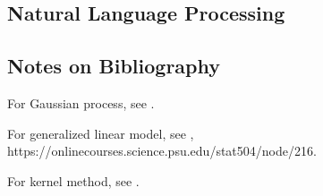 \begin{refsection}
	\startcontents[chapters]	
\chapter{Natural Language Processing}
	



\section{Notes on Bibliography}
For Gaussian process, see \cite{rasmussen2006gaussian}.


For generalized linear model, see \cite{dobson2008introduction}, https://onlinecourses.science.psu.edu/stat504/node/216.


For kernel method, see \cite{shawe2004kernel}.

\printbibliography
\end{refsection}

